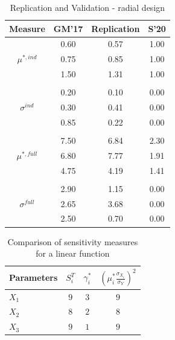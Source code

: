 \phantom{This text will be invisible} 
\hspace{5cm} %
\setlength{\tabcolsep}{12pt} %
\begin{table}[H]
	\centering
	\caption{Replication and Validation - radial design}
	\label{tab:repval2}
	\renewcommand{\arraystretch}{1.2}%
	\begin{tabular}{cS[table-format=3.2]S[table-format=3.2]S[table-format=3.2]}
		\toprule
		{Measure}     & {GM'17}   & {Replication}  & {S'20} \\ 
		\midrule
		
		& 0.60  & 0.57         &  1.00 \\
		\qquad $\mu^{*,ind}$                               & 0.75  & 0.85         &  1.00 \\
		& 1.50  & 1.31         &  1.00 \\
		&&& \\
		& 0.20   & 0.10         &  0.00 \\
		\qquad $\sigma^{ind}$                            & 0.30   & 0.41         &  0.00 \\
		& 0.85  & 0.22         & 0.00 \\
		&&& \\
		& 7.50  & 6.84         &  2.30 \\
		\qquad $\mu^{*,full}$                              & 6.80   & 7.77         &  1.91 \\
		& 4.75  & 4.19         &  1.41 \\
		&&& \\
		& 2.90  & 1.15         &  0.00 \\
		\qquad $\sigma^{full}$                           & 2.65  & 3.68         &  0.00 \\
		& 2.50   & 0.70         &  0.00 \\ \bottomrule
	\end{tabular}
\end{table}

\newpage
\phantom{This text will be invisible} 
\vspace{10mm} %
\begin{table}[H]
	\centering
	\caption{Comparison of sensitivity measures for a linear function}
	\label{tab:bad-mu}
	\begin{tabular}{@{}lccc@{}}
		\toprule
		Parameters & $S_i^T$ & $\gamma_i^*$ & $(\mu_i^* \frac{\sigma_{X_i}}{\sigma_Y})^2$ \\ \midrule
		$X_1$ & $9$                       & $3$   & $9$   \\
		$X_2$ & $8$                       & $2$   & $8$   \\
		$X_3$ & $9$                       & $1$   & $9$   \\ \bottomrule
	\end{tabular}
\end{table}

